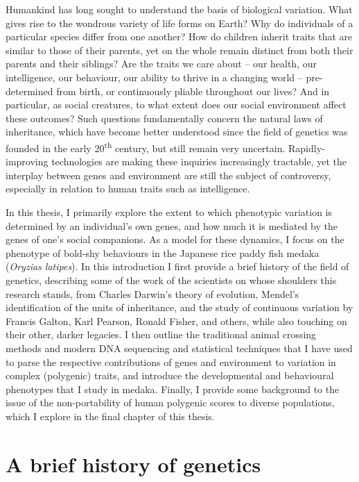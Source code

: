 \documentclass[
]{book}
\begin{document}
Humankind has long sought to understand the basis of biological variation. What gives rise to the wondrous variety of life forms on Earth? Why do individuals of a particular species differ from one another? How do children inherit traits that are similar to those of their parents, yet on the whole remain distinct from both their parents and their siblings? Are the traits we care about -- our health, our intelligence, our behaviour, our ability to thrive in a changing world -- pre-determined from birth, or continuously pliable throughout our lives? And in particular, as social creatures, to what extent does our social environment affect these outcomes? Such questions fundamentally concern the natural laws of inheritance, which have become better understood since the field of genetics was founded in the early 20\textsuperscript{th} century, but still remain very uncertain. Rapidly-improving technologies are making these inquiries increasingly tractable, yet the interplay between genes and environment are still the subject of controversy, especially in relation to human traits such as intelligence.

In this thesis, I primarily explore the extent to which phenotypic variation is determined by an individual's own genes, and how much it is mediated by the genes of one's social companions. As a model for these dynamics, I focus on the phenotype of bold-shy behaviours in the Japanese rice paddy fish medaka (\emph{Oryzias latipes}). In this introduction I first provide a brief history of the field of genetics, describing some of the work of the scientists on whose shoulders this research stands, from Charles Darwin's theory of evolution, Mendel's identification of the units of inheritance, and the study of continuous variation by Francis Galton, Karl Pearson, Ronald Fisher, and others, while also touching on their other, darker legacies. I then outline the traditional animal crossing methods and modern DNA sequencing and statistical techniques that I have used to parse the respective contributions of genes and environment to variation in complex (polygenic) traits, and introduce the developmental and behavioural phenotypes that I study in medaka. Finally, I provide some background to the issue of the non-portability of human polygenic scores to diverse populations, which I explore in the final chapter of this thesis.

\hypertarget{a-brief-history-of-genetics}{%
\section{A brief history of genetics}\label{a-brief-history-of-genetics}}
\end{document}
